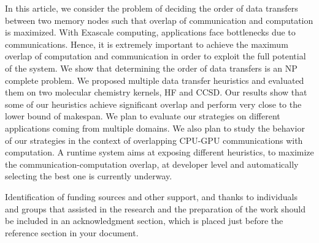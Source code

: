 \documentclass[sigconf]{acmart}
\begin{document}
	
	In this article, we consider the problem of deciding the order of data transfers between two memory nodes such that overlap of communication and  computation is maximized. With Exascale computing, applications face bottlenecks due to communications. Hence, it is extremely important to achieve the maximum overlap of computation and communication in order to exploit the full potential of the system. We show that determining the order of data transfers is an NP complete problem. We proposed multiple data transfer heuristics and evaluated them on two molecular chemistry kernels, HF and CCSD. Our results show that some of our heuristics achieve significant overlap and perform very close to the lower bound of makespan. We plan to evaluate our strategies on different applications coming from multiple domains. We also plan to study the behavior of our strategies in the context of overlapping CPU-GPU communications with computation. A runtime system aims at exposing different heuristics, to maximize the communication-computation overlap, at developer level and automatically selecting the best one is currently underway.
	
	
	\begin{acks}
		Identification of funding sources and other support, and thanks to individuals and groups that assisted in the research and the preparation of the work should be included in an acknowledgment section, which is placed just before the reference section in your document. 
		
	\end{acks}
	
	
	
	
	
	
	
\end{document}
